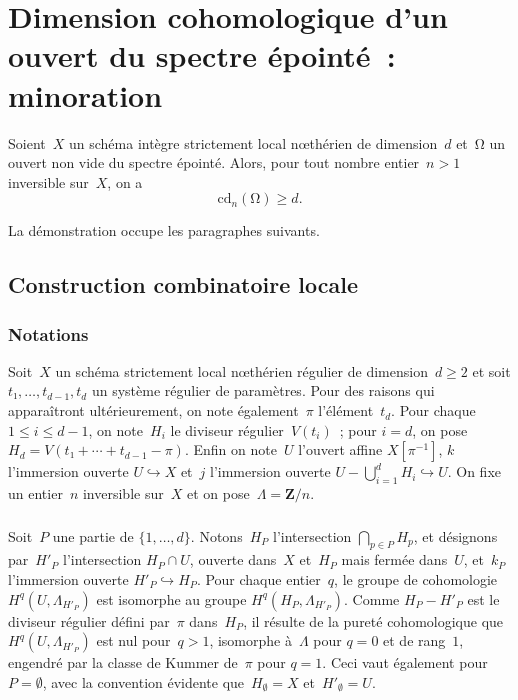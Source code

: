 \documentclass[10pt]{../fichiers-configuration-latex/smfart}
\begin{document}
\section{Dimension cohomologique d'un ouvert du spectre épointé : minoration}
\label{18B-minoration-ouvert-spectre-épointé}

\begin{théorème}
Soient $X$ un schéma intègre strictement local nœthérien de
dimension $d$ et $Ω$ un ouvert non vide du spectre épointé. Alors, pour tout nombre
entier $n>1$ inversible sur $X$, on a
\[
\mathrm{cd}_n(Ω) ≥ d.
\]
\end{théorème}

La démonstration occupe les paragraphes suivants.

\subsection{Construction combinatoire locale}
\label{18B-construction-combinatoire-locale}
\subsubsection{Notations}
Soit $X$ un schéma strictement local nœthérien régulier de
dimension $d ≥ 2$ et soit $t₁,…,t_{d-1},t_d$ un système régulier de
paramètres. Pour des raisons qui apparaîtront ultérieurement, on
note également $π$ l'élément $t_d$. Pour chaque $1 ≤ i ≤ d-1$, on note $H_i$ le
diviseur régulier $V(t_i)$ ; pour $i=d$, on pose
$H_d=V(t₁+\cdots+t_{d-1}-π)$. Enfin on note $U$ l'ouvert
affine $X[π^{-1}]$, $k$ l'immersion ouverte $U ↪ X$
et $j$ l'immersion ouverte $U-⋃_{i=1}^d H_i ↪ U$.
On fixe un entier $n$ inversible sur $X$ et on pose $Λ=𝐙/n$.

\subsubsection{}
\label{18B-cohomologie-via-pureté}
Soit $P$ une partie de $\{1,…,d\}$.
Notons $H_P$ l'intersection $⋂_{p ∈ P} H_p$, et désignons
par $H′_P$ l'intersection $H_P ∩ U$, ouverte dans $X$ et $H_P$
mais fermée dans $U$, et $k_P$ l'immersion ouverte $H′_P ↪ H_P$.
Pour chaque entier $q$, le groupe de cohomologie $H^q(U,Λ_{H′_P})$ est isomorphe
au groupe $H^q(H_P,Λ_{H′_P})$. Comme $H_P-H′_P$ est le diviseur
régulier défini par $π$ dans $H_P$, il résulte de la pureté
cohomologique que $H^q(U,Λ_{H′_P})$ est nul pour $q>1$,
isomorphe à $Λ$ pour $q=0$ et de rang $1$, engendré par
la classe de Kummer de $π$ pour $q=1$. Ceci vaut
également pour $P=∅$, avec la convention évidente
que $H_∅=X$ et $H′_∅=U$.
\end{document}
